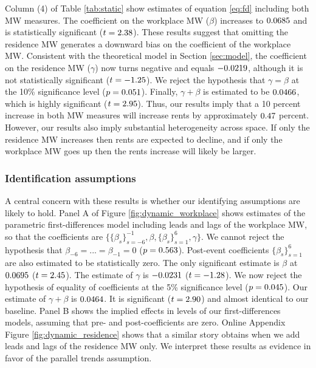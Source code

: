 Column (4) of Table \ref{tab:static} show estimates of equation \eqref{eq:fd}
including both MW measures.
The coefficient on the workplace MW ($\beta$) increases to $0.0685$ and 
is statistically significant ($t=2.38$).
These results suggest that omitting the residence MW generates a downward
bias on the coefficient of the workplace MW.
Consistent with the theoretical model in Section \ref{sec:model}, the 
coefficient on the residence MW ($\gamma$) now turns negative and equals 
$-0.0219$, although it is not statistically significant 
($t=-1.25$).
We reject the hypothesis that $\gamma=\beta$ at the 10\% significance level 
($p = 0.051$).
Finally, $\gamma+\beta$ is estimated to be $0.0466$, which is highly 
significant ($t=2.95$).
Thus, our results imply that a 10 percent increase in both MW measures will 
increase rents by approximately $0.47$ percent.
However, our results also imply substantial heterogeneity across space.
If only the residence MW increases then rents are expected to decline,
and if only the workplace MW goes up then the rents increase will likely 
be larger.

\subsubsection{Identification assumptions}

A central concern with these results is whether our identifying assumptions are 
likely to hold.
Panel A of Figure \ref{fig:dynamic_workplace} shows estimates of the 
parametric first-differences model including leads and lags of the workplace MW, 
so that the coefficients are 
$\{\{\beta_s\}_{s=-6}^{-1},\beta,\{\beta_s\}_{s=1}^6,\gamma\}$.
We cannot reject the hypothesis that $\beta_{-6}=...=\beta_{-1}=0$ 
($p = 0.563$).
Post-event coefficients $\{\beta_s\}_{s=1}^6$ are also estimated to be 
statistically zero.
The only significant estimate is $\beta$ at $0.0695$ 
($t=2.45$).
The estimate of $\gamma$ is $-0.0231$ 
($t=-1.28$).
We now reject the hypothesis of equality of coefficients at the 5\% 
significance level ($p = 0.045$).
Our estimate of $\gamma+\beta$ is $0.0464$.
It is significant ($t=2.90$) and almost identical to our 
baseline.
Panel B shows the implied effects in levels of our first-differences models,
assuming that pre- and post-coefficients are zero.
Online Appendix Figure \ref{fig:dynamic_residence} shows that a similar story 
obtains when we add leads and lags of the residence MW only.
We interpret these results as evidence in favor of the parallel trends 
assumption.

